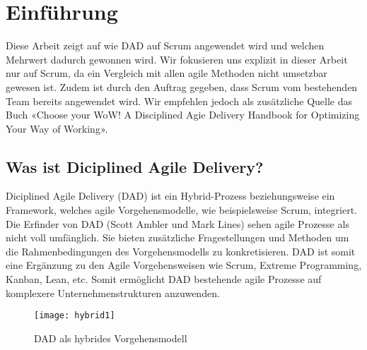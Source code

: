 
\chapter{Einführung}
\thispagestyle{fancy}
Diese Arbeit zeigt auf wie DAD auf Scrum angewendet wird und welchen Mehrwert dadurch gewonnen wird. Wir fokusieren uns explizit in dieser Arbeit nur auf Scrum, da ein Vergleich mit allen agile Methoden nicht umsetzbar gewesen ist. Zudem ist durch den Auftrag gegeben, dass Scrum vom bestehenden Team bereits angewendet wird.\smallskip
Wir empfehlen jedoch als zusätzliche Quelle das Buch «Choose your WoW! A Disciplined Agie Delivery Handbook for Optimizing Your Way of Working». %

\section{Was ist Diciplined Agile Delivery?}

Diciplined Agile Delivery (DAD) ist ein Hybrid-Prozess beziehungsweise ein Framework, welches agile Vorgehensmodelle, wie beispielsweise Scrum, integriert. Die Erfinder von DAD (Scott Ambler und Mark Lines) sehen agile Prozesse als nicht voll umfänglich. Sie bieten zusätzliche Fragestellungen und Methoden um die Rahmenbedingungen des Vorgehensmodells zu konkretisieren. DAD ist somit eine Ergänzung zu den Agile Vorgehensweisen wie Scrum, Extreme Programming, Kanban, Lean, etc. Somit ermöglicht DAD bestehende agile Prozesse auf komplexere Unternehmenstrukturen anzuwenden.\newline

\begin{figure}[H]
	\centering
	\texttt{[image: hybrid1]}
	\caption{DAD als hybrides Vorgehensmodell}
	\label{fig:hybrid}
\end{figure}
